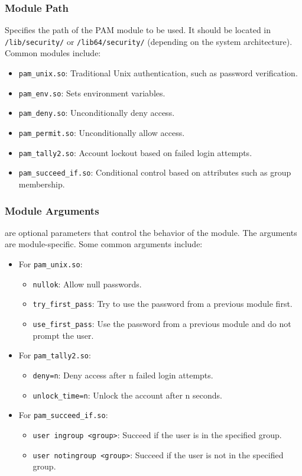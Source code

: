 \documentclass{article}
\begin{document}
\subsubsection{Module Path}
Specifies the path of the PAM module to be used. It should be located in \verb|/lib/security/| or \verb|/lib64/security/| (depending on the system architecture). Common modules include:
\begin{itemize}
    \item \verb|pam_unix.so|: Traditional Unix authentication, such as password verification.
    \item \verb|pam_env.so|: Sets environment variables.
    \item \verb|pam_deny.so|: Unconditionally deny access.
    \item \verb|pam_permit.so|: Unconditionally allow access.
    \item \verb|pam_tally2.so|: Account lockout based on failed login attempts.
    \item \verb|pam_succeed_if.so|: Conditional control based on attributes such as group membership.
\end{itemize}

\subsubsection{Module Arguments}
are optional parameters that control the behavior of the module. The arguments are module-specific. Some common arguments include:
\begin{itemize}
    \item For \verb|pam_unix.so|:
    \begin{itemize}
        \item \verb|nullok|: Allow null passwords.
        \item \verb|try_first_pass|: Try to use the password from a previous module first.
        \item \verb|use_first_pass|: Use the password from a previous module and do not prompt the user.
    \end{itemize}
    \item For \verb|pam_tally2.so|:
    \begin{itemize}
        \item \verb|deny=n|: Deny access after n failed login attempts.
        \item \verb|unlock_time=n|: Unlock the account after n seconds.
    \end{itemize}
    \item For \verb|pam_succeed_if.so|:
    \begin{itemize}
        \item \verb|user ingroup <group>|: Succeed if the user is in the specified group.
        \item \verb|user notingroup <group>|: Succeed if the user is not in the specified group.
    \end{itemize}
\end{itemize}
\end{document}
